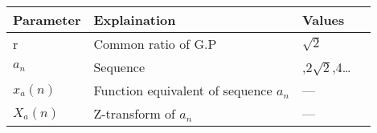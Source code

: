 \begin{table}[ht]
    \begin{tabular}{ | >{\centering\arraybackslash}m{2cm} | >{\centering\arraybackslash}m{3cm} | >{\centering\arraybackslash}m{2cm} | @{}m{0pt}@{} }
    \hline
    \textbf{Parameter} & \textbf{Explaination} & \textbf{Values} &\\[10pt]
    \hline
    r & Common ratio of G.P & $\sqrt{2}$ &\\[10pt]
    \hline
    $a_n$ & Sequence & 2,$2\sqrt{2}$,4\dots &\\[10pt]
    \hline
    $x_a(n)$ & Function equivalent of sequence $a_n$ & --- &\\[10pt]
    \hline 
    $X_a(n)$ & Z-transform of $a_n$ & --- &\\[10pt]
    \hline 
    \end{tabular}
    \begin{center}
    \end{center}
\end{table}
